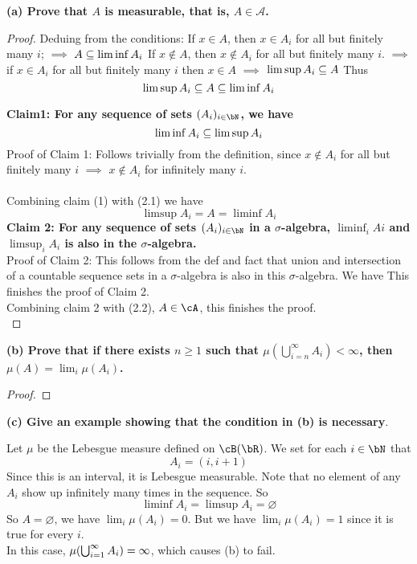 \documentclass[lang=cn,11pt]{elegantbook}
\begin{document}
\noindent \textbf{(a) Prove that \(A\) is measurable, that is, \(A \in \mathcal{A}\).}
\begin{proof}
    Deduing from the conditions:
    If \(x \in A\), then \(x \in A_i\) for all but finitely many \(i\); $\implies $ $A \subseteq \liminf A_i$
    If \(x \notin A\), then \(x \notin A_i\) for all but finitely many \(i\). $\implies $ if \(x \in A_i\) for all but finitely many \(i\) then $x\in A$ $\implies$  $\limsup A_i \subseteq A$
    Thus 
    \begin{equation}
    \limsup A_i \subseteq A \subseteq \liminf A_i    
    \end{equation}
    
\noindent   \textbf{Claim1: For any sequence of sets $(A_i)_{i \in \bN}$, we have 
$$\liminf A_i \subseteq \limsup A_i$$} 
Proof of Claim 1: Follows trivially from the definition, since \(x \notin A_i\) for all but finitely many \(i\) $\implies$ \(x \notin A_i\) for infinitely many \(i\).\\\\
Combining claim (1) with (2.1) we have
\begin{equation}
\limsup A_i  =  A  = \liminf A_i    
\end{equation}
\noindent \textbf{Claim 2: For any sequence of sets $(A_i)_{i\in \bN}$ in a $\sigma$-algebra, $\liminf_i Ai$ and $\limsup_i A_i$ is also in the $\sigma$-algebra.}\\
Proof of Claim 2: This follows from the def and fact that union and intersection of a countable sequence sets in a $\sigma$-algebra is also in this $\sigma$-algebra. We have
This finishes the proof of Claim 2.\\
\noindent Combining claim 2 with (2.2), $A \in \cA$, this finishes the proof.\\
\end{proof}

\noindent \textbf{(b)  Prove that if there exists \(n \geq 1\) such that \(\mu\left(\bigcup_{i=n}^\infty A_i\right) < \infty\), then \(\mu(A) = \lim_i \mu(A_i)\).}
\begin{proof}
    
\end{proof}


\noindent \textbf{(c) Give an example showing that the condition in (b) is necessary}.
\begin{solution}
\noindent  Let $\mu$ be the Lebesgue measure defined on $\cB(\bR)$. We set for each $i\in \bN$ that
\[
   A_i =(i,i+1)
\]
\noindent Since this is an interval, it is Lebesgue measurable. Note that no element of any $A_i$ show up infinitely many times in the sequence. So 
$$
\liminf A_i = \limsup A_i = \varnothing
$$
\noindent So $A = \varnothing$, we have $\lim_i \mu(A_i) = 0$.
\noindent But we have $\lim_i \mu(A_i)  = 1$ since it is true for every $i$.\\
\noindent In this case, $\mu(\bigcup_{i=1}^\infty A_i) = \infty$, which causes (b) to fail.
\end{solution}
\end{document}
